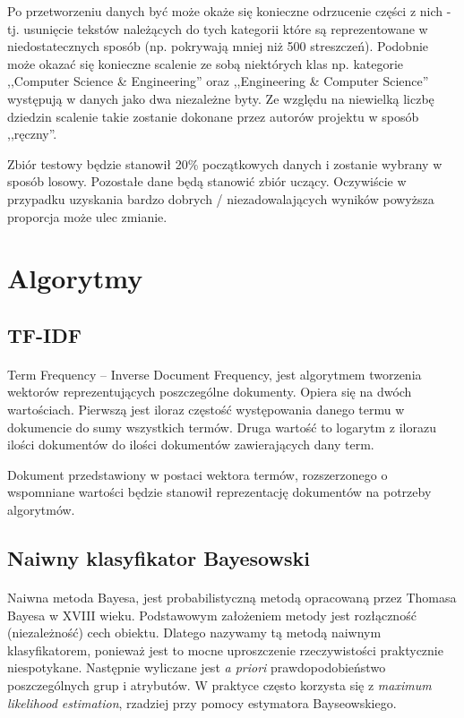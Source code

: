 \documentclass[a4paper,12pt]{article}
\begin{document}
	Po przetworzeniu danych być może okaże się konieczne odrzucenie
	części z nich - tj. usunięcie tekstów należących do tych kategorii 
	które są reprezentowane w niedostatecznych sposób (np. pokrywają
	mniej niż 500 streszczeń). Podobnie może okazać się konieczne 
	scalenie ze sobą niektórych klas np. kategorie ,,Computer Science & Engineering'' oraz ,,Engineering & Computer Science'' występują w danych jako dwa niezależne byty. Ze względu na niewielką liczbę
	dziedzin scalenie takie zostanie dokonane przez autorów projektu
	w sposób ,,ręczny''.
	
	Zbiór testowy będzie stanowił 20\% początkowych danych i zostanie
	wybrany w sposób losowy. Pozostałe dane będą stanowić zbiór uczący.
	Oczywiście w przypadku uzyskania bardzo dobrych / niezadowalających
	wyników powyższa proporcja może ulec zmianie.
	

\section{Algorytmy}
\subsection{TF-IDF}
\paragraph{}
Term Frequency – Inverse Document Frequency, jest algorytmem tworzenia
wektorów reprezentujących poszczególne dokumenty. Opiera się na dwóch
wartościach. Pierwszą jest iloraz częstość występowania danego termu w
dokumencie do sumy wszystkich termów. Druga wartość to logarytm z ilorazu
ilości dokumentów do ilości dokumentów zawierających dany term. 

Dokument przedstawiony w postaci wektora termów, rozszerzonego o wspomniane
wartości będzie stanowił reprezentację dokumentów na potrzeby algorytmów. 

\subsection{Naiwny klasyfikator Bayesowski}
\paragraph{}

Naiwna metoda Bayesa, jest probabilistyczną metodą opracowaną przez Thomasa
Bayesa w XVIII wieku. Podstawowym założeniem metody jest rozłączność
(niezależność) cech obiektu. Dlatego nazywamy tą metodą naiwnym
klasyfikatorem, ponieważ jest to mocne uproszczenie rzeczywistości
praktycznie niespotykane. Następnie wyliczane jest \textit{a priori}
prawdopodobieństwo poszczególnych grup i atrybutów. W praktyce często
korzysta się z  \textit{maximum likelihood estimation}, rzadziej przy pomocy
estymatora Bayseowskiego.
\end{document}
